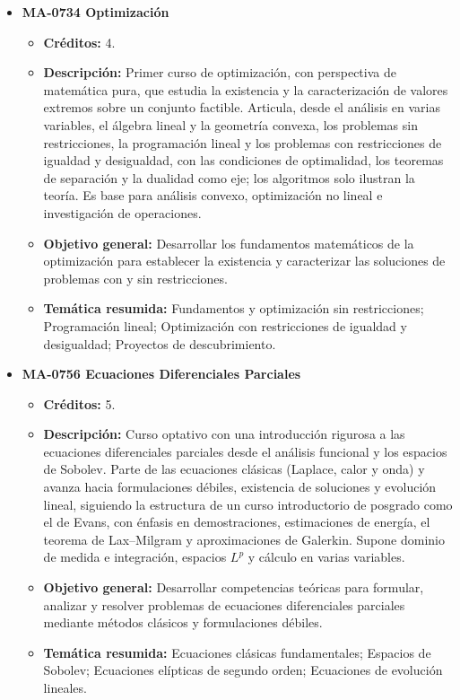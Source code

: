 \begin{itemize}[leftmargin=1.3em, itemsep=10pt, topsep=4pt, label={\color{Azul-UCR}$\blacksquare$}]
\item {\color{Azul-UCR}\textbf{MA-0734 Optimización}}\par\nopagebreak\smallskip
\begin{itemize}[leftmargin=1.1em, itemsep=3pt, topsep=2pt, parsep=2pt, label={\textendash}]
\item \textbf{Créditos:} 4.
\item \textbf{Descripción:} Primer curso de optimización, con perspectiva de matemática pura, que estudia la existencia y la caracterización de valores extremos sobre un conjunto factible. Articula, desde el análisis en varias variables, el álgebra lineal y la geometría convexa, los problemas sin restricciones, la programación lineal y los problemas con restricciones de igualdad y desigualdad, con las condiciones de optimalidad, los teoremas de separación y la dualidad como eje; los algoritmos solo ilustran la teoría. Es base para análisis convexo, optimización no lineal e investigación de operaciones.
\item \textbf{Objetivo general:} Desarrollar los fundamentos matemáticos de la optimización para establecer la existencia y caracterizar las soluciones de problemas con y sin restricciones.
\item \textbf{Temática resumida:} Fundamentos y optimización sin restricciones; Programación lineal; Optimización con restricciones de igualdad y desigualdad; Proyectos de descubrimiento.
\end{itemize}

\item {\color{Azul-UCR}\textbf{MA-0756 Ecuaciones Diferenciales Parciales}}\par\nopagebreak\smallskip
\begin{itemize}[leftmargin=1.1em, itemsep=3pt, topsep=2pt, parsep=2pt, label={\textendash}]
\item \textbf{Créditos:} 5.
\item \textbf{Descripción:} Curso optativo con una introducción rigurosa a las ecuaciones diferenciales parciales desde el análisis funcional y los espacios de Sobolev. Parte de las ecuaciones clásicas (Laplace, calor y onda) y avanza hacia formulaciones débiles, existencia de soluciones y evolución lineal, siguiendo la estructura de un curso introductorio de posgrado como el de Evans, con énfasis en demostraciones, estimaciones de energía, el teorema de Lax--Milgram y aproximaciones de Galerkin. Supone dominio de medida e integración, espacios $L^p$ y cálculo en varias variables.
\item \textbf{Objetivo general:} Desarrollar competencias teóricas para formular, analizar y resolver problemas de ecuaciones diferenciales parciales mediante métodos clásicos y formulaciones débiles.
\item \textbf{Temática resumida:} Ecuaciones clásicas fundamentales; Espacios de Sobolev; Ecuaciones elípticas de segundo orden; Ecuaciones de evolución lineales.
\end{itemize}


\end{itemize}
